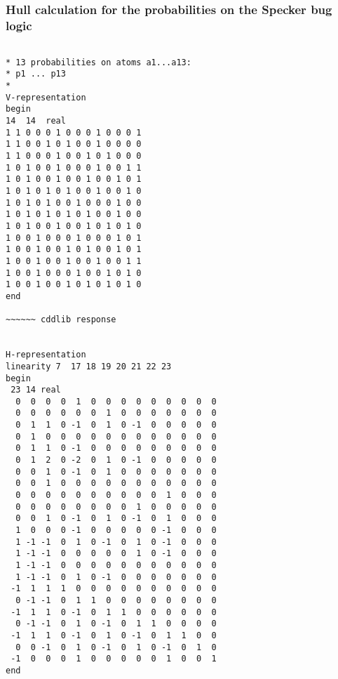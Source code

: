 \documentclass[%
 showpacs,
 showkeys,
 preprintnumbers,
 amsmath,amssymb,
 aps,
  pra,
  longbibliography,
 floatfix,
 ]{revtex4-1}
\begin{document}
\subsubsection{Hull calculation for the probabilities on the Specker bug logic}

{ \begin{lstlisting}[backgroundcolor=\color{yellow!10},framerule=0pt,breaklines=true, frame=tb]

* 13 probabilities on atoms a1...a13:
* p1 ... p13
*
V-representation
begin
14  14  real
1 1 0 0 0 1 0 0 0 1 0 0 0 1
1 1 0 0 1 0 1 0 0 1 0 0 0 0
1 1 0 0 0 1 0 0 1 0 1 0 0 0
1 0 1 0 0 1 0 0 0 1 0 0 1 1
1 0 1 0 0 1 0 0 1 0 0 1 0 1
1 0 1 0 1 0 1 0 0 1 0 0 1 0
1 0 1 0 1 0 0 1 0 0 0 1 0 0
1 0 1 0 1 0 1 0 1 0 0 1 0 0
1 0 1 0 0 1 0 0 1 0 1 0 1 0
1 0 0 1 0 0 0 1 0 0 0 1 0 1
1 0 0 1 0 0 1 0 1 0 0 1 0 1
1 0 0 1 0 0 1 0 0 1 0 0 1 1
1 0 0 1 0 0 0 1 0 0 1 0 1 0
1 0 0 1 0 0 1 0 1 0 1 0 1 0
end

~~~~~~ cddlib response


H-representation
linearity 7  17 18 19 20 21 22 23
begin
 23 14 real
  0  0  0  0  1  0  0  0  0  0  0  0  0  0
  0  0  0  0  0  0  1  0  0  0  0  0  0  0
  0  1  1  0 -1  0  1  0 -1  0  0  0  0  0
  0  1  0  0  0  0  0  0  0  0  0  0  0  0
  0  1  1  0 -1  0  0  0  0  0  0  0  0  0
  0  1  2  0 -2  0  1  0 -1  0  0  0  0  0
  0  0  1  0 -1  0  1  0  0  0  0  0  0  0
  0  0  1  0  0  0  0  0  0  0  0  0  0  0
  0  0  0  0  0  0  0  0  0  0  1  0  0  0
  0  0  0  0  0  0  0  0  1  0  0  0  0  0
  0  0  1  0 -1  0  1  0 -1  0  1  0  0  0
  1  0  0  0 -1  0  0  0  0  0 -1  0  0  0
  1 -1 -1  0  1  0 -1  0  1  0 -1  0  0  0
  1 -1 -1  0  0  0  0  0  1  0 -1  0  0  0
  1 -1 -1  0  0  0  0  0  0  0  0  0  0  0
  1 -1 -1  0  1  0 -1  0  0  0  0  0  0  0
 -1  1  1  1  0  0  0  0  0  0  0  0  0  0
  0 -1 -1  0  1  1  0  0  0  0  0  0  0  0
 -1  1  1  0 -1  0  1  1  0  0  0  0  0  0
  0 -1 -1  0  1  0 -1  0  1  1  0  0  0  0
 -1  1  1  0 -1  0  1  0 -1  0  1  1  0  0
  0  0 -1  0  1  0 -1  0  1  0 -1  0  1  0
 -1  0  0  0  1  0  0  0  0  0  1  0  0  1
end

\end{lstlisting}  }
\end{document}
